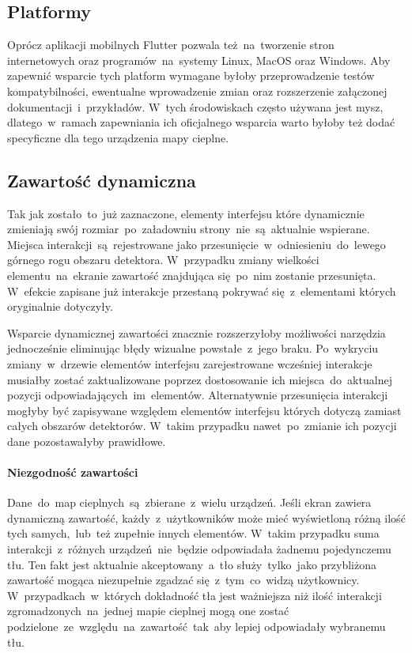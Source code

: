 \subsection{Platformy}
Oprócz aplikacji mobilnych Flutter pozwala też~na~tworzenie stron internetowych oraz programów~na~systemy Linux, MacOS oraz Windows. Aby zapewnić wsparcie tych platform wymagane byłoby przeprowadzenie testów kompatybilności, ewentualne wprowadzenie zmian oraz rozszerzenie załączonej dokumentacji~i~przykładów. W~tych środowiskach często używana jest mysz, dlatego~w~ramach zapewniania ich oficjalnego wsparcia warto byłoby też dodać specyficzne dla tego urządzenia mapy cieplne.

\subsection{Zawartość dynamiczna}
Tak jak zostało~to~już zaznaczone, elementy interfejsu które dynamicznie zmieniają swój rozmiar~po~załadowniu strony~nie~są~aktualnie wspierane. Miejsca interakcji~są~rejestrowane jako przesunięcie~w~odniesieniu~do~lewego górnego rogu obszaru detektora. W~przypadku zmiany wielkości elementu~na~ekranie zawartość znajdująca się~po~nim zostanie przesunięta. W~efekcie zapisane już interakcje przestaną pokrywać się~z~elementami których oryginalnie dotyczyły. 

Wsparcie dynamicznej zawartości znacznie rozszerzyłoby możliwości narzędzia jednocześnie eliminując błędy wizualne powstałe~z~jego braku. Po~wykryciu zmiany~w~drzewie elementów interfejsu zarejestrowane wcześniej interakcje musiałby zostać zaktualizowane poprzez dostosowanie ich miejsca~do~aktualnej pozycji odpowiadających~im~elementów. Alternatywnie przesunięcia interakcji mogłyby być zapisywane względem elementów interfejsu których dotyczą zamiast całych obszarów detektorów. W~takim przypadku nawet~po~zmianie ich pozycji dane pozostawałyby prawidłowe.

\paragraph{Niezgodność zawartości}
Dane~do~map cieplnych~są~zbierane~z~wielu urządzeń. Jeśli ekran zawiera dynamiczną zawartość, każdy~z~użytkowników może mieć wyświetloną różną ilość tych samych,~lub~też zupełnie innych elementów. W~takim przypadku suma interakcji~z~różnych urządzeń~nie~będzie odpowiadała żadnemu pojedynczemu tłu. Ten fakt jest aktualnie akceptowany~a~tło służy~tylko~jako przybliżona zawartość mogąca niezupełnie zgadzać się~z~tym~co~widzą użytkownicy. W~przypadkach~w~których dokładność tła jest ważniejsza niż ilość interakcji zgromadzonych~na~jednej mapie cieplnej mogą one zostać podzielone~ze~względu~na~zawartość~tak~aby lepiej odpowiadały wybranemu tłu.


